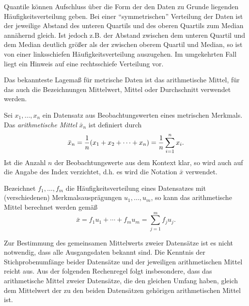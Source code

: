 \documentclass{lecture}
\begin{document}
    Quantile können Aufschluss über die Form der den Daten zu Grunde liegenden Häufigkeitsverteilung geben.
    Bei einer ``symmetrischen'' Verteilung der Daten ist der jeweilige Abstand des unteren Quartils und des oberen Quartils zum Median annähernd gleich.
    Ist jedoch z.B. der Abstand zwischen dem unteren Quartil und dem Median deutlich größer als der zwischen oberem Quartil und Median, so ist von einer linksschiefen Häufigkeitsverteilung auszugehen.
    Im umgekehrten Fall liegt ein Hinweis auf eine rechtsschiefe Verteilung vor.

    Das bekannteste Lagemaß für metrische Daten ist das arithmetische Mittel, für das auch die Bezeichnungen Mittelwert, Mittel oder Durchschnitt verwendet werden.

    \begin{definition}
        Sei \(x_1, \ldots, x_n\) ein Datensatz aus Beobachtungswerten eines metrischen Merkmals.
        Das \emph{arithmetische Mittel} \(\bar{x}_n\) ist definiert durch
        \[
            \bar{x}_n = \frac{1}{n}\parentheses*{x_1 + x_2 + \cdots + x_n} = \frac{1}{n}\sum_{i = 1}^n x_i.
        \]
        Ist die Anzahl \(n\) der Beobachtungswerte aus dem Kontext klar, so wird auch auf die Angabe des Index verzichtet, d.h. es wird die Notation \(\bar{x}\) verwendet.
    \end{definition}

    \begin{calcrule}
        Bezeichnet \(f_1, \ldots, f_m\) die Häufigkeitsverteilung eines Datensatzes mit (verschiedenen) Merkmalsausprägungen \(u_1, \ldots, u_m\), so kann das arithmetische Mittel berechnet werden gemäß
        \[
            \bar{x} = f_1 u_1 + \cdots + f_m u_m = \sum_{j = 1}^m f_j u_j.
        \]
    \end{calcrule}

    Zur Bestimmung des gemeinsamen Mittelwerts zweier Datensätze ist es nicht notwendig, dass alle Ausgangsdaten bekannt sind.
    Die Kenntnis der Stichprobenumfänge beider Datensätze und der jeweiligen arithmetischen Mittel reicht aus.
    Aus der folgenden Rechenregel folgt insbesondere, dass das arithmetische Mittel zweier Datensätze, die den gleichen Umfang haben, gleich dem Mittelwert der zu den beiden Datensätzen gehörigen arithmetischen Mittel ist.
\end{document}
